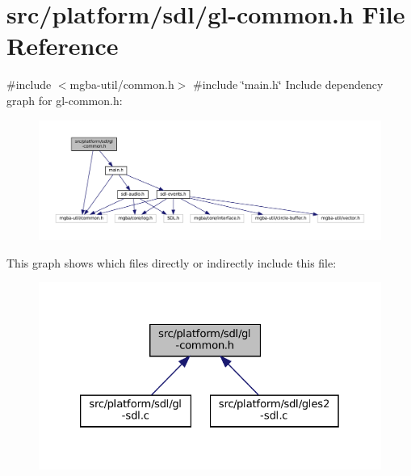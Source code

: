 \hypertarget{gl-common_8h}{}\section{src/platform/sdl/gl-\/common.h File Reference}
\label{gl-common_8h}
{\ttfamily \#include $<$mgba-\/util/common.\+h$>$}\newline
{\ttfamily \#include \char`\"{}main.\+h\char`\"{}}\newline
Include dependency graph for gl-\/common.h\+:
\nopagebreak
\begin{figure}[H]
\begin{center}
\leavevmode
\includegraphics[width=350pt]{gl-common_8h__incl}
\end{center}
\end{figure}
This graph shows which files directly or indirectly include this file\+:
\nopagebreak
\begin{figure}[H]
\begin{center}
\leavevmode
\includegraphics[width=326pt]{gl-common_8h__dep__incl}
\end{center}
\end{figure}
